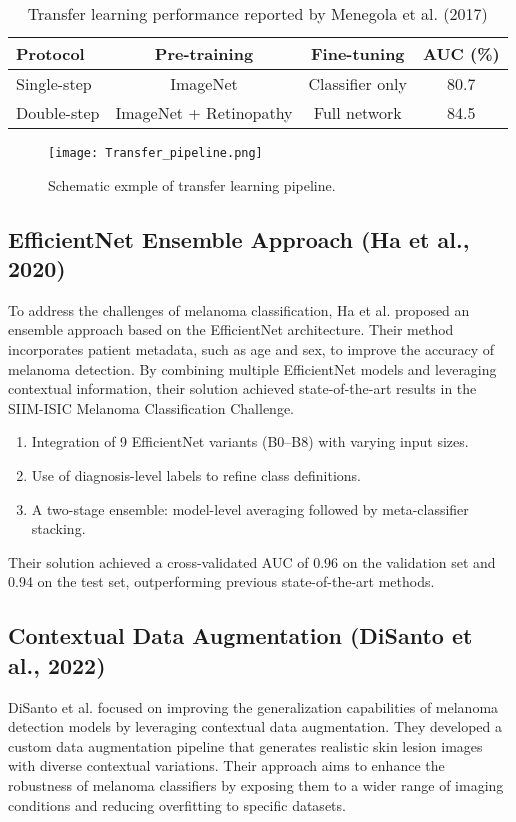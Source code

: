 \begin{table}[h!]
  \centering
  \caption{Transfer learning performance reported by Menegola et al. (2017)}
  \label{tab:menegola-results}
  \begin{tabular}{lccc}
    \hline
    Protocol & Pre-training & Fine-tuning & AUC (\%) \\
    \hline
    Single-step & ImageNet & Classifier only & 80.7 \\
    Double-step & ImageNet + Retinopathy & Full network & 84.5 \\
    \hline
  \end{tabular}
\end{table}

\begin{figure}[H]
  \centering
  \texttt{[image: Transfer\_pipeline.png]}
  \caption{Schematic exmple of transfer learning pipeline.}
  \label{fig:menegola-pipeline}
\end{figure}

\subsection{EfficientNet Ensemble Approach (Ha et al., 2020)}
To address the challenges of melanoma classification, Ha et al. \cite{ha2020efficientnet} proposed an ensemble approach based on the EfficientNet architecture. Their method incorporates patient metadata, such as age and sex, to improve the accuracy of melanoma detection. By combining multiple EfficientNet models and leveraging contextual information, their solution achieved state-of-the-art results in the SIIM-ISIC Melanoma Classification Challenge.

\begin{enumerate}
  \item Integration of 9 EfficientNet variants (B0--B8) with varying input sizes.
  \item Use of diagnosis-level labels to refine class definitions.
  \item A two-stage ensemble: model-level averaging followed by meta-classifier stacking.
\end{enumerate}
Their solution achieved a cross-validated AUC of 0.96 on the validation set and 0.94 on the test set, outperforming previous state-of-the-art methods. 


\subsection{Contextual Data Augmentation (DiSanto et al., 2022)}
DiSanto et al. \cite{disanto2022contextual} focused on improving the generalization capabilities of melanoma detection models by leveraging contextual data augmentation. They developed a custom data augmentation pipeline that generates realistic skin lesion images with diverse contextual variations. Their approach aims to enhance the robustness of melanoma classifiers by exposing them to a wider range of imaging conditions and reducing overfitting to specific datasets.

